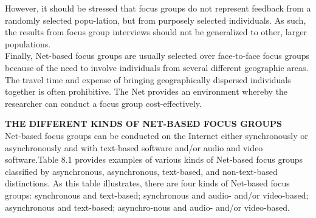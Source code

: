 \documentclass[a4,9pt]{beamer}
\begin{document}
\begin{frame}
 However, it should be stressed that focus groups do not represent feedback from a randomly selected popu-lation, but from purposely selected individuals. As such, the results from focus group interviews should not be generalized to other, larger populations.\\
\hspace*{0.5cm} Finally, Net-based focus groups are usually selected over face-to-face focus groups because of the need to involve individuals from several different geographic areas. The travel time and expense of bringing geographically dispersed individuals together is often prohibitive. The Net provides an environment whereby the researcher can conduct a focus group cost-effectively.\\
\end{frame}

\begin{frame}

\textbf{THE DIFFERENT KINDS OF NET-BASED FOCUS GROUPS}\\

\vspace*{0.3cm}
Net-based focus groups can be conducted on the Internet either synchronously or asynchronously and with text-based software and/or audio and video software.Table 8.1 provides examples of various kinds of Net-based focus groups classified by asynchronous, asynchronous, text-based, and non-text-based distinctions. As this table illustrates, there are four kinds of Net-based focus groups: synchronous and text-based; synchronous and audio- and/or video-based; asynchronous and text-based; asynchro-nous and audio- and/or video-based.\\
\end{frame}
\end{document}
